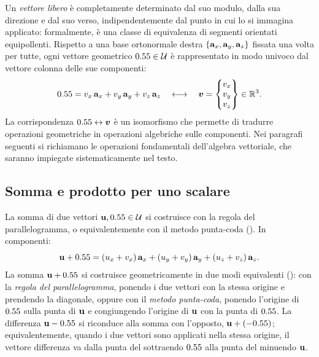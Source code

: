 Un \textit{vettore libero} è completamente determinato dal suo modulo,
dalla sua direzione e dal suo verso, indipendentemente dal punto in cui
lo si immagina applicato: formalmente, è una classe di equivalenza di
segmenti orientati equipollenti. Rispetto a una base ortonormale destra
$\{\mathbf{a}_x, \mathbf{a}_y, \mathbf{a}_z\}$ fissata una volta per tutte, ogni vettore
geometrico $0.55 \in \mathcal{U}$ è rappresentato in modo univoco dal vettore
colonna delle sue componenti:
\begin{equation}
	0.55 = v_x\,\mathbf{a}_x + v_y\,\mathbf{a}_y + v_z\,\mathbf{a}_z
	\quad\longleftrightarrow\quad
	\bm{v} = \begin{Bmatrix} v_x \\ v_y \\ v_z \end{Bmatrix} \in \mathbb{R}^3.
\end{equation}
La corrispondenza $0.55 \leftrightarrow \bm{v}$ è un isomorfismo che
permette di tradurre operazioni geometriche in operazioni algebriche sulle
componenti. Nei paragrafi seguenti si richiamano le operazioni fondamentali
dell'algebra vettoriale, che saranno impiegate sistematicamente nel testo.


\subsection{Somma e prodotto per uno scalare}

La somma di due vettori $\mathbf{u}, 0.55 \in \mathcal{U}$ si costruisce con la regola
del parallelogramma, o equivalentemente con il metodo punta-coda
(). 
In componenti:
\begin{equation}
	\mathbf{u} + 0.55 = (u_x+v_x)\,\mathbf{a}_x + (u_y+v_y)\,\mathbf{a}_y + (u_z+v_z)\,\mathbf{a}_z.
\end{equation}
La somma $\mathbf{u} + 0.55$ si costruisce geometricamente in due modi	equivalenti (): con la \textit{regola del 	parallelogramma}, ponendo i due vettori con la stessa origine e	prendendo la diagonale, oppure con il \textit{metodo punta-coda}, ponendo l'origine di $0.55$ sulla punta di $\mathbf{u}$ e congiungendo	l'origine di $\mathbf{u}$ con la punta di $0.55$. La differenza $\mathbf{u} - 0.55$	si riconduce alla somma con l'opposto, $\mathbf{u} + (-0.55)$; equivalentemente, quando i due vettori sono applicati nella stessa origine, il vettore	differenza va dalla punta del sottraendo $0.55$ alla punta del minuendo	$\mathbf{u}$.


